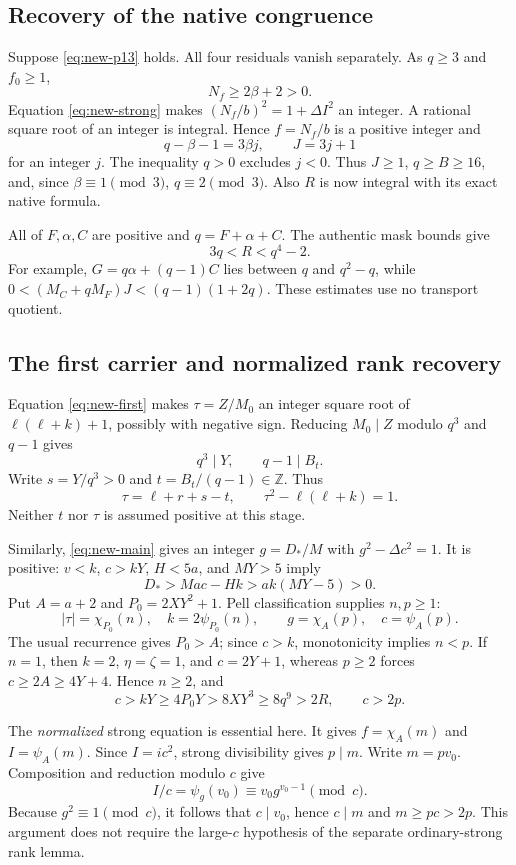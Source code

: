\subsection{Recovery of the native congruence}

Suppose \eqref{eq:new-p13} holds.  All four residuals vanish separately.
As $q\ge3$ and $f_0\ge1$,
\[
 N_f\ge2\beta+2>0.
\]
Equation \eqref{eq:new-strong} makes $(N_f/b)^2=1+\Delta I^2$ an integer.
A rational square root of an integer is integral.  Hence $f=N_f/b$ is a
positive integer and
\[
 q-\beta-1=3\beta j,\qquad J=3j+1
\]
for an integer $j$.  The inequality $q>0$ excludes $j<0$.  Thus $J\ge1$,
$q\ge B\ge16$, and, since $\beta\equiv1\pmod3$,
$q\equiv2\pmod3$.  Also $R$ is now integral with its exact native formula.

All of $F,\alpha,C$ are positive and $q=F+\alpha+C$.  The authentic mask
bounds give
\begin{equation}
 3q<R<q^4-2.\label{eq:new-rbounds}
\end{equation}
For example, $G=q\alpha+(q-1)C$ lies between $q$ and $q^2-q$, while
$0<(M_C+qM_F)J<(q-1)(1+2q)$.  These estimates use no transport quotient.

\subsection{The first carrier and normalized rank recovery}

Equation \eqref{eq:new-first} makes $\tau=Z/M_0$ an integer square root of
$\ell(\ell+k)+1$, possibly with negative sign.  Reducing $M_0\mid Z$
modulo $q^3$ and $q-1$ gives
\[
 q^3\mid Y,\qquad q-1\mid B_t.
\]
Write $s=Y/q^3>0$ and $t=B_t/(q-1)\in\mathbb Z$.  Thus
\[
 \tau=\ell+r+s-t,\qquad \tau^2-\ell(\ell+k)=1.
\]
Neither $t$ nor $\tau$ is assumed positive at this stage.

Similarly, \eqref{eq:new-main} gives an integer
$g=D_*/M$ with $g^2-\Delta c^2=1$.  It is positive: $v<k$, $c>kY$,
$H<5a$, and $MY>5$ imply
\[
 D_*>Mac-Hk>ak(MY-5)>0.
\]
Put $A=a+2$ and $P_0=2XY^2+1$.  Pell classification supplies $n,p\ge1$:
\[
 |\tau|=\chi_{P_0}(n),\quad k=2\psi_{P_0}(n),\qquad
 g=\chi_A(p),\quad c=\psi_A(p).
\]
The usual recurrence gives $P_0>A$; since $c>k$, monotonicity implies
$n<p$.  If $n=1$, then $k=2$, $\eta=\zeta=1$, and $c=2Y+1$, whereas
$p\ge2$ forces $c\ge2A\ge4Y+4$.  Hence $n\ge2$, and
\[
 c>kY\ge4P_0Y>8XY^3\ge8q^9>2R,\qquad c>2p.
\]

The \emph{normalized} strong equation is essential here.  It gives
$f=\chi_A(m)$ and $I=\psi_A(m)$.  Since $I=ic^2$, strong divisibility
gives $p\mid m$.  Write $m=pv_0$.  Composition and reduction modulo $c$
give
\[
 I/c=\psi_g(v_0)\equiv v_0g^{v_0-1}\pmod c.
\]
Because $g^2\equiv1\pmod c$, it follows that $c\mid v_0$, hence
$c\mid m$ and $m\ge pc>2p$.  This argument does not require the
large-$c$ hypothesis of the separate ordinary-strong rank lemma.

